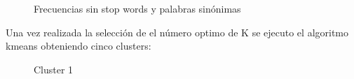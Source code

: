\begin{figure}[H]
	\centering
	\caption{Frecuencias sin stop words y palabras sinónimas} \label{fig:sin}
\end{figure} 

Una vez realizada la selección de el número optimo de K se ejecuto el algoritmo kmeans obteniendo cinco clusters:

\begin{figure}[H]
	\centering
	\caption{Cluster 1} \label{fig:c1}
\end{figure}

